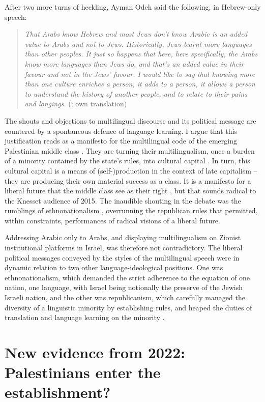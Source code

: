 \documentclass[output=paper,arabicfont]{langscibook}
\begin{document}
After two more turns of heckling, Ayman Odeh said the following, in Hebrew-only speech: 

\begin{quote}
\textit{That Arabs know Hebrew and most Jews don’t know Arabic is an added value to Arabs and not to Jews. Historically, Jews learnt more languages than other peoples. It just so happens that here, here specifically, the Arabs know more languages than Jews do, and that’s an added value in their favour and not in the Jews’ favour. I would like to say that knowing more than one culture enriches a person, it adds to a person, it allows a person to understand the history of another people, and to relate to their pains and longings.} (\citealt[132–133]{knesset2015a}; own translation)
\end{quote}

The shouts and objections to multilingual discourse and its political message are countered by a spontaneous defence of language learning. I argue that this justification reads as a manifesto for the multilingual code of the emerging Palestinian middle class \citep{ghanem2016a}. They are turning their multilingualism, once a burden of a minority contained by the state’s rules, into cultural capital \citep{block2013a}. In turn, this cultural capital is a means of (self-)production in the context of late capitalism – they are producing their own material success as a class. It is a manifesto for a liberal future that the middle class see as their right \citep{dean2014a}, but that sounds radical to the Knesset audience of 2015. The inaudible shouting in the debate was the rumblings of ethnonationalism \citep{peled1992a}, overrunning the republican rules that permitted, within constraints, performances of radical visions of a liberal future.

Addressing Arabic only to Arabs, and displaying multilingualism on Zionist institutional platforms in Israel, was therefore not contradictory. The liberal political messages conveyed by the styles of the multilingual speech were in dynamic relation to two other language-ideological positions. One was ethnonationalism, which demanded the strict adherence to the equation of one nation, one language, with Israel being notionally the preserve of the Jewish Israeli nation, and the other was republicanism, which carefully managed the diversity of a linguistic minority by establishing rules, and heaped the duties of translation and language learning on the minority \citep{gal2012a}.

\section{New evidence from 2022: Palestinians enter the establishment?}
\end{document}
